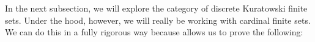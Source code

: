 In the next subsection, we will explore the category of discrete Kuratowski finite
sets.
Under the hood, however, we will really be working with cardinal finite sets.
We can do this in a fully rigorous way because
 allows us to prove the following:
\begin{agdalisting}\label{cardinal-kuratowski}
\end{agdalisting}


